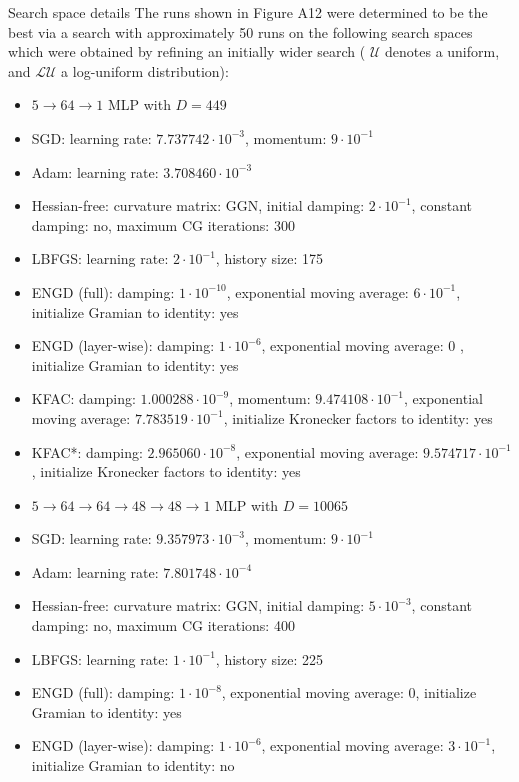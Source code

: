 \documentclass[10pt]{article}
\begin{document}
Search space details The runs shown in Figure A12 were determined to be the best via a search with approximately 50 runs on the following search spaces which were obtained by refining an initially wider search ( $\mathcal{U}$ denotes a uniform, and $\mathcal{L U}$ a log-uniform distribution):

\begin{itemize}
  \item $5 \rightarrow 64 \rightarrow 1$ MLP with $D=449$
  \item SGD: learning rate: $7.737742 \cdot 10^{-3}$, momentum: $9 \cdot 10^{-1}$
  \item Adam: learning rate: $3.708460 \cdot 10^{-3}$
  \item Hessian-free: curvature matrix: GGN, initial damping: $2 \cdot 10^{-1}$, constant damping: no, maximum CG iterations: 300
  \item LBFGS: learning rate: $2 \cdot 10^{-1}$, history size: 175
  \item ENGD (full): damping: $1 \cdot 10^{-10}$, exponential moving average: $6 \cdot 10^{-1}$, initialize Gramian to identity: yes
  \item ENGD (layer-wise): damping: $1 \cdot 10^{-6}$, exponential moving average: 0 , initialize Gramian to identity: yes
  \item KFAC: damping: $1.000288 \cdot 10^{-9}$, momentum: $9.474108 \cdot 10^{-1}$, exponential moving average: $7.783519 \cdot 10^{-1}$, initialize Kronecker factors to identity: yes
  \item KFAC*: damping: $2.965060 \cdot 10^{-8}$, exponential moving average: $9.574717 \cdot 10^{-1}$, initialize Kronecker factors to identity: yes
  \item $5 \rightarrow 64 \rightarrow 64 \rightarrow 48 \rightarrow 48 \rightarrow 1$ MLP with $D=10065$
  \item SGD: learning rate: $9.357973 \cdot 10^{-3}$, momentum: $9 \cdot 10^{-1}$
  \item Adam: learning rate: $7.801748 \cdot 10^{-4}$
  \item Hessian-free: curvature matrix: GGN, initial damping: $5 \cdot 10^{-3}$, constant damping: no, maximum CG iterations: 400
  \item LBFGS: learning rate: $1 \cdot 10^{-1}$, history size: 225
  \item ENGD (full): damping: $1 \cdot 10^{-8}$, exponential moving average: 0, initialize Gramian to identity: yes
  \item ENGD (layer-wise): damping: $1 \cdot 10^{-6}$, exponential moving average: $3 \cdot 10^{-1}$, initialize Gramian to identity: no

\end{itemize}
\end{document}
